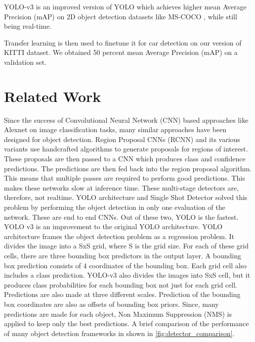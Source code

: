 \documentclass[10pt,twocolumn,letterpaper]{article}
\begin{document}
YOLO-v3 is an improved version of YOLO \cite{redmon2016yolov1} which achieves 
higher mean Average Precision (mAP) on 2D object detection datasets like MS-COCO \cite{mscoco}, while still being real-time.  

Transfer learning is then used to finetune it for car detection on our version of KITTI dataset. We obtained 50 percent mean Average Precision (mAP) on a validation set.
\section{Related Work}
Since the success of Convolutional Neural Network (CNN) based approaches like Alexnet \cite{Alexnet} on image classification tasks, many similar approaches have been designed for object detection. Region Proposal CNNs (RCNN) \cite{ren2015faster} and its various variants use handcrafted algorithms to generate proposals for regions of interest. These proposals are then passed to a CNN which produces class and confidence predictions. The predictions are then fed back into the region proposal algorithm. This means that multiple passes are required to perform good predictions. This makes these networks slow at inference time. These multi-stage detectors are, therefore, not realtime. 
YOLO architecture \cite{redmon2016yolov1} and Single Shot Detector \cite{SSD_v1} solved this problem by performing the object detection in only one evaluation of the network. These are end to end CNNs. Out of these two, YOLO is the fastest. YOLO v3 \cite{redmon2018yolov3} is an improvement to the original YOLO architecture. YOLO architecture frames the object detection problem as a regression problem. It divides the image into a SxS grid, where S is the grid size. For each of these grid cells, there are three bounding box predictors in the output layer. A bounding box prediction consists of 4 coordinates of the bounding box. Each grid cell also includes a class prediction. YOLO-v3 also divides the images into SxS cell, but it produces class probabilities for each bounding box not just for each grid cell. Predictions are also made at three different scales. Prediction of the bounding box coordinates are also as offsets of bounding box priors. Since, many predictions are made for each object, Non Maximum Suppression (NMS) is applied to keep only the best predictions. A brief comparison of the performance of many object detection frameworks in shown in \ref{fig:detector_comparison}.
\end{document}
